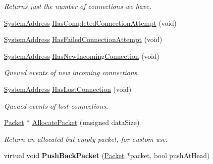 \begin{DoxyCompactItemize}
\begin{DoxyCompactList}\small\item\em Returns just the number of connections we have. \end{DoxyCompactList}\item 
\hyperlink{struct_rak_net_1_1_system_address}{System\-Address} \hyperlink{class_rak_net_1_1_t_c_p_interface_a48611e0a624a21c7486d03b218749771}{Has\-Completed\-Connection\-Attempt} (void)
\item 
\hyperlink{struct_rak_net_1_1_system_address}{System\-Address} \hyperlink{class_rak_net_1_1_t_c_p_interface_a78657fee627030602b615d8646710931}{Has\-Failed\-Connection\-Attempt} (void)
\item 
\hypertarget{class_rak_net_1_1_t_c_p_interface_a66ee4ad49b99c1b142c90f3ed2034fc0}{\hyperlink{struct_rak_net_1_1_system_address}{System\-Address} \hyperlink{class_rak_net_1_1_t_c_p_interface_a66ee4ad49b99c1b142c90f3ed2034fc0}{Has\-New\-Incoming\-Connection} (void)}\label{class_rak_net_1_1_t_c_p_interface_a66ee4ad49b99c1b142c90f3ed2034fc0}

\begin{DoxyCompactList}\small\item\em Queued events of new incoming connections. \end{DoxyCompactList}\item 
\hypertarget{class_rak_net_1_1_t_c_p_interface_a068fe8bafc2ec11e3f8c02ebae831242}{\hyperlink{struct_rak_net_1_1_system_address}{System\-Address} \hyperlink{class_rak_net_1_1_t_c_p_interface_a068fe8bafc2ec11e3f8c02ebae831242}{Has\-Lost\-Connection} (void)}\label{class_rak_net_1_1_t_c_p_interface_a068fe8bafc2ec11e3f8c02ebae831242}

\begin{DoxyCompactList}\small\item\em Queued events of lost connections. \end{DoxyCompactList}\item 
\hypertarget{class_rak_net_1_1_t_c_p_interface_acaca19d5eaacfd5cd3ff413fcd6ab0db}{\hyperlink{struct_rak_net_1_1_packet}{Packet} $\ast$ \hyperlink{class_rak_net_1_1_t_c_p_interface_acaca19d5eaacfd5cd3ff413fcd6ab0db}{Allocate\-Packet} (unsigned data\-Size)}\label{class_rak_net_1_1_t_c_p_interface_acaca19d5eaacfd5cd3ff413fcd6ab0db}

\begin{DoxyCompactList}\small\item\em Return an allocated but empty packet, for custom use. \end{DoxyCompactList}\item 
\hypertarget{class_rak_net_1_1_t_c_p_interface_a0cdc74a931eac2fd2e5617f8c62f99ae}{virtual void {\bfseries Push\-Back\-Packet} (\hyperlink{struct_rak_net_1_1_packet}{Packet} $\ast$packet, bool push\-At\-Head)}\label{class_rak_net_1_1_t_c_p_interface_a0cdc74a931eac2fd2e5617f8c62f99ae}


\end{DoxyCompactItemize}
